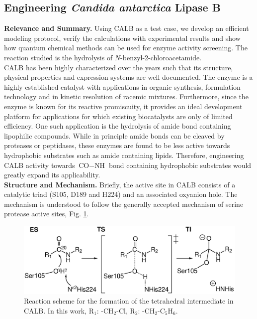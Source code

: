 \subsection{Engineering {\textit{Candida antarctica} Lipase B}}
\textbf{Relevance and Summary.}
Using CALB as a test case, we develop an efficient modeling protocol, verify the calculations with experimental results and show how quantum chemical methods can be used for enzyme activity screening\cite{10.1371/journal.pone.0049849, hediger2013silico}.
The reaction studied is the hydrolysis of $N$-benzyl-2-chloroacetamide.\\
CALB has been highly characterized over the years such that its structure, physical properties and expression systems are well documented\cite{uppenberg1994sequence, uppenberg1995crystallographic}.
The enzyme is a highly established catalyst with applications in organic synthesis, formulation technology\cite{gayot2003modification} and in kinetic resolution of racemic mixtures\cite{gotor2006candida, naik2010lipases, chaput2012contribution}.
Furthermore, since the enzyme is known for its reactive promiscuity\cite{bornscheuer2004catalytic, CBIC:CBIC200800318}, it provides an ideal development platform for applications for which existing biocatalysts are only of limited efficiency.
One such application is the hydrolysis of amide bond containing lipophilic compounds.
While in principle amide bonds can be cleaved by proteases or peptidases, these enzymes are found to be less active towards hydrophobic substrates such as amide containing lipids\cite{nakagawa2007engineering}.
Therefore, engineering CALB activity towards ${\text{CO}-\text{NH}}$ bond containing hydrophobic substrates would greatly expand its applicability.\\
\textbf{Structure and Mechanism.}
Briefly, the active site in CALB consists of a catalytic triad (S105, D189 and H224) and an associated oxyanion hole.
The mechanism is understood to follow the generally accepted mechanism of serine protease active sites\cite{hedstrom2002serine}, Fig. \ref{fig:calb-mechanism}.
\begin{figure}[htbp] 
\includegraphics[width=0.98\linewidth]{calb-mechanism.eps}
\caption{
Reaction scheme for the formation of the tetrahedral intermediate in CALB.
In this work, R$_1$: -CH$_2$-Cl, R$_2$: -CH$_2$-C$_5$H$_6$\cite{hediger2013silico}.
}
\label{fig:calb-mechanism}
\end{figure}

